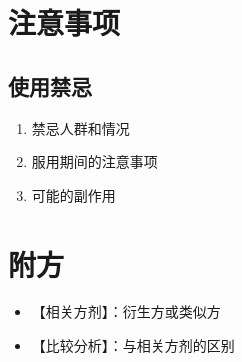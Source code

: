 \documentclass[12pt,UTF8]{ctexbook}
\begin{document}
\section{注意事项}
\subsection{使用禁忌}
\begin{enumerate}[leftmargin=2cm]
	\item 禁忌人群和情况
	\item 服用期间的注意事项
	\item 可能的副作用
\end{enumerate}

\section{附方}
\begin{itemize}
	\item 【相关方剂】：衍生方或类似方
	\item 【比较分析】：与相关方剂的区别
\end{itemize}

\backmatter
\end{document}
